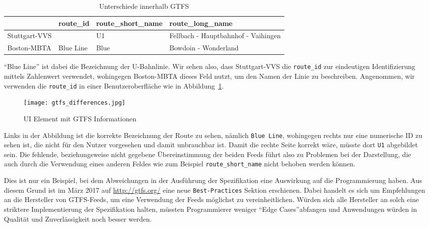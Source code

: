         \begin{longtable}{|>{\raggedright \arraybackslash}p{3.0cm}|>{\raggedright \arraybackslash}p{2.0cm}|>{\raggedright \arraybackslash}p{3.5cm}|>{\raggedright \arraybackslash}p{5.5cm}|}
        \caption{Unterschiede innerhalb GTFS} 
        \label{table:gtfs_differences}\\
          \hline
           & route\_id & route\_short\_name & route\_long\_name\\
          \hline
          Stuttgart-VVS & 379 & U1 & Fellbach - Hauptbahnhof - Vaihingen\\
          \hline
          Boston-MBTA & Blue Line & Blue & Bowdoin - Wonderland\\
          \hline
        \end{longtable}

        "`Blue Line"' ist dabei die Bezeichnung der U-Bahnlinie\parencite{wiki_blue_line}. Wir sehen also, dass Stuttgart-VVS die \texttt{route\_id} zur eindeutigen Identifizierung mittels Zahlenwert verwendet, wohingegen Boston-MBTA dieses Feld nutzt, um den Namen der Linie zu beschreiben. Angenommen, wir verwenden die \texttt{route\_id} in einer Benutzeroberfläche wie in Abbildung~\ref{fig:gtfs_differences}.

        \begin{figure}[htbp]
          \begin{center}
            \texttt{[image: gtfs\_differences.jpg]}
            \caption{UI Element mit GTFS Informationen}
            \label{fig:gtfs_differences}
          \end{center}
        \end{figure}

        Links in der Abbildung ist die korrekte Bezeichnung der Route zu sehen, nämlich \texttt{Blue Line}, wohingegen rechts nur eine numerische ID zu sehen ist, die nicht für den Nutzer vorgesehen und damit unbrauchbar ist. Damit die rechte Seite korrekt wäre, müsste dort \texttt{U1} abgebildet sein. Die fehlende, beziehungsweise nicht gegebene Übereinstimmung der beiden Feeds führt also zu Problemen bei der Darstellung, die auch durch die Verwendung eines anderen Feldes wie zum Beispiel \texttt{route\_short\_name} nicht behoben werden können. 

        Dies ist nur ein Beispiel, bei dem Abweichungen in der Ausführung der Spezifikation eine Auswirkung auf die Programmierung haben. Aus diesem Grund ist im März 2017 auf \url{http://gtfs.org/} eine neue \texttt{Best-Practices} Sektion erschienen. Dabei handelt es sich um Empfehlungen an die Hersteller von GTFS-Feeds, um eine Verwendung der Feeds möglichst zu vereinheitlichen. Würden sich alle Hersteller an solch eine striktere Implementierung der Spezifikation halten, müssten Programmierer weniger "`Edge Cases"'\footnotemark abfangen und Anwendungen würden in Qualität und Zuverlässigkeit noch besser werden.\\

